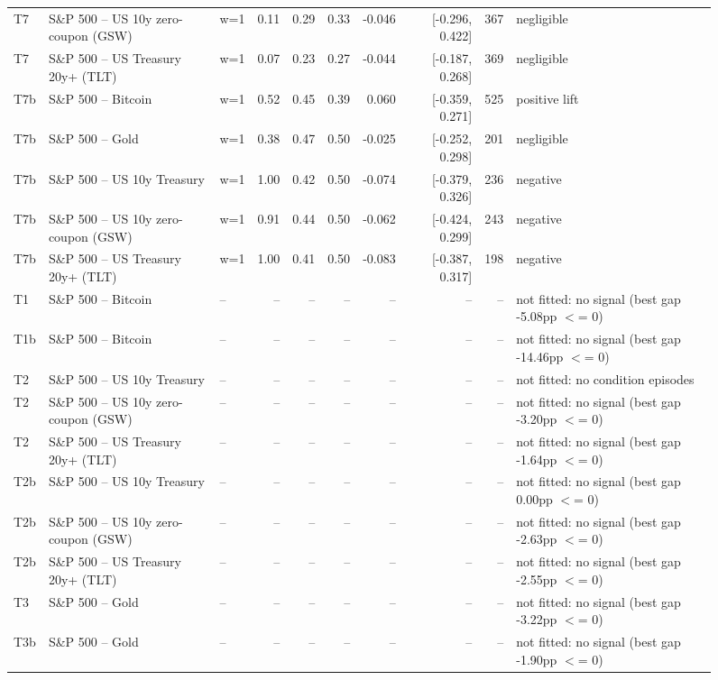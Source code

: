 \begin{figure}
\begin{tabular}{lllrrrrrrl}
T7 & S\&P 500 -- US 10y zero-coupon (GSW) & w=1 & 0.11 & 0.29 & 0.33 & -0.046 & [-0.296, 0.422] & 367 & negligible \\
T7 & S\&P 500 -- US Treasury 20y+ (TLT) & w=1 & 0.07 & 0.23 & 0.27 & -0.044 & [-0.187, 0.268] & 369 & negligible \\
T7b & S\&P 500 -- Bitcoin & w=1 & 0.52 & 0.45 & 0.39 & 0.060 & [-0.359, 0.271] & 525 & positive lift \\
T7b & S\&P 500 -- Gold & w=1 & 0.38 & 0.47 & 0.50 & -0.025 & [-0.252, 0.298] & 201 & negligible \\
T7b & S\&P 500 -- US 10y Treasury & w=1 & 1.00 & 0.42 & 0.50 & -0.074 & [-0.379, 0.326] & 236 & negative \\
T7b & S\&P 500 -- US 10y zero-coupon (GSW) & w=1 & 0.91 & 0.44 & 0.50 & -0.062 & [-0.424, 0.299] & 243 & negative \\
T7b & S\&P 500 -- US Treasury 20y+ (TLT) & w=1 & 1.00 & 0.41 & 0.50 & -0.083 & [-0.387, 0.317] & 198 & negative \\
T1 & S\&P 500 -- Bitcoin & -- & -- & -- & -- & -- & -- & -- & not fitted: no signal (best gap -5.08pp $<$= 0) \\
T1b & S\&P 500 -- Bitcoin & -- & -- & -- & -- & -- & -- & -- & not fitted: no signal (best gap -14.46pp $<$= 0) \\
T2 & S\&P 500 -- US 10y Treasury & -- & -- & -- & -- & -- & -- & -- & not fitted: no condition episodes \\
T2 & S\&P 500 -- US 10y zero-coupon (GSW) & -- & -- & -- & -- & -- & -- & -- & not fitted: no signal (best gap -3.20pp $<$= 0) \\
T2 & S\&P 500 -- US Treasury 20y+ (TLT) & -- & -- & -- & -- & -- & -- & -- & not fitted: no signal (best gap -1.64pp $<$= 0) \\
T2b & S\&P 500 -- US 10y Treasury & -- & -- & -- & -- & -- & -- & -- & not fitted: no signal (best gap 0.00pp $<$= 0) \\
T2b & S\&P 500 -- US 10y zero-coupon (GSW) & -- & -- & -- & -- & -- & -- & -- & not fitted: no signal (best gap -2.63pp $<$= 0) \\
T2b & S\&P 500 -- US Treasury 20y+ (TLT) & -- & -- & -- & -- & -- & -- & -- & not fitted: no signal (best gap -2.55pp $<$= 0) \\
T3 & S\&P 500 -- Gold & -- & -- & -- & -- & -- & -- & -- & not fitted: no signal (best gap -3.22pp $<$= 0) \\
T3b & S\&P 500 -- Gold & -- & -- & -- & -- & -- & -- & -- & not fitted: no signal (best gap -1.90pp $<$= 0) \\

\end{tabular}
\end{figure}
